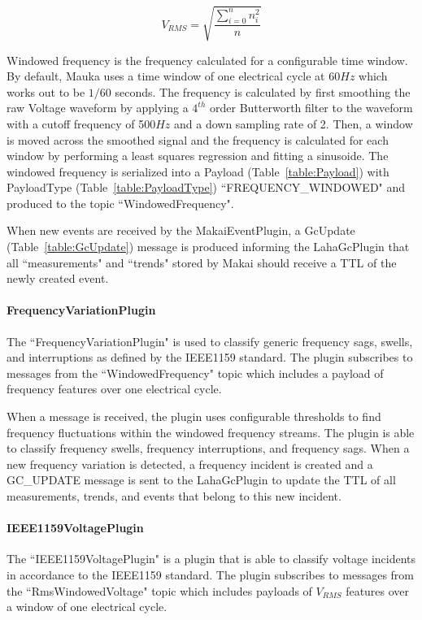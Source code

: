 \begin{equation}
\label{equation:Vrms}
	V_{RMS} = \sqrt{\frac{\sum_{i=0}^{n} n_{i}^2}{n}}
\end{equation}

Windowed frequency is the frequency calculated for a configurable time window. By default, Mauka uses a time window of one electrical cycle at 60$Hz$ which works out to be $1/60$ seconds. The frequency is calculated by first smoothing the raw Voltage waveform by applying a $4^{th}$ order Butterworth filter to the waveform with a cutoff frequency of 500$Hz$ and a down sampling rate of 2. Then, a window is moved across the smoothed signal and the frequency is calculated for each window by performing a least squares regression and fitting a sinusoide. The windowed frequency is serialized into a Payload (Table~\ref{table:Payload}) with PayloadType (Table~\ref{table:PayloadType}) ``FREQUENCY\_WINDOWED" and produced to the topic ``WindowedFrequency".

When new events are received by the MakaiEventPlugin, a GcUpdate (Table~\ref{table:GcUpdate}) message is produced informing the LahaGcPlugin that all ``measurements" and ``trends" stored by Makai should receive a TTL of the newly created event.

\paragraph{FrequencyVariationPlugin}
The ``FrequencyVariationPlugin" is used to classify generic frequency sags, swells, and interruptions as defined by the IEEE1159 standard\cite{IEEE:2018:1159D3}. The plugin subscribes to messages from the ``WindowedFrequency" topic which includes a payload of frequency features over one electrical cycle.

When a message is received, the plugin uses configurable thresholds to find frequency fluctuations within the windowed frequency streams. The plugin is able to classify frequency swells, frequency interruptions, and frequency sags. When a new frequency variation is detected, a frequency incident is created and a GC\_UPDATE message is sent to the LahaGcPlugin to update the TTL of all measurements, trends, and events that belong to this new incident.

\paragraph{IEEE1159VoltagePlugin}
The ``IEEE1159VoltagePlugin" is a plugin that is able to classify voltage incidents in accordance to the IEEE1159 standard\cite{IEEE:2018:1159D3}. The plugin subscribes to messages from the ``RmsWindowedVoltage" topic which includes payloads of $V_{RMS}$ features over a window of one electrical cycle.

